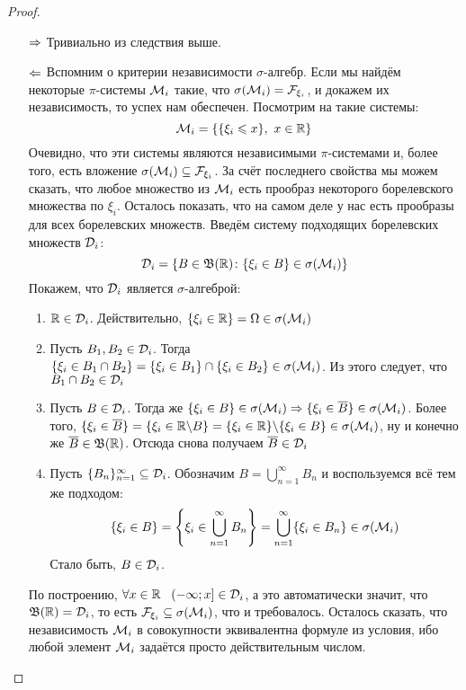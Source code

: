 \begin{proof}~
	\begin{itemize}
		\item[$\Rightarrow$] Тривиально из следствия выше.
		
		\item[$\Leftarrow$] Вспомним о критерии независимости $\sigma$-алгебр. Если мы найдём некоторые $\pi$-системы $\mathcal{M}_i$ такие, что $\sigma(\mathcal{M}_i) = \mathcal{F}_{\xi_i}$, и докажем их независимость, то успех нам обеспечен. Посмотрим на такие системы:
		\[
			\mathcal{M}_i = \{\{\xi_i \leqslant x\},\ x \in \mathbb{R}\}
		\]
		Очевидно, что эти системы являются независимыми $\pi$-системами и, более того, есть вложение $\sigma(\mathcal{M}_i) \subseteq \mathcal{F}_{\xi_i}$. За счёт последнего свойства мы можем сказать, что любое множество из $\mathcal{M}_i$ есть прообраз некоторого борелевского множества по $\xi_i$. Осталось показать, что на самом деле у нас есть прообразы для всех борелевских множеств. Введём систему подходящих борелевских множеств $\mathcal{D}_i$:
		\[
			\mathcal{D}_i = \{B \in \mathfrak{B}(\mathbb{R}) \colon \{\xi_i \in B\} \in \sigma(\mathcal{M}_i)\}
		\]
		Покажем, что $\mathcal{D}_i$ является $\sigma$-алгеброй:
		\begin{enumerate}
			\item $\mathbb{R} \in \mathcal{D}_i$. Действительно, $\{\xi_i \in \mathbb{R}\} = \Omega \in \sigma(\mathcal{M}_i)$
			
			\item Пусть $B_1, B_2 \in \mathcal{D}_i$. Тогда $\{\xi_i \in B_1 \cap B_2\} = \{\xi_i \in B_1\} \cap \{\xi_i \in B_2\} \in \sigma(\mathcal{M}_i)$. Из этого следует, что $B_1 \cap B_2 \in \mathcal{D}_i$
			
			\item Пусть $B \in \mathcal{D}_i$. Тогда же $\{\xi_i \in B\} \in \sigma(\mathcal{M}_i) \Rightarrow \{\xi_i \in \overline{B}\} \in \sigma(\mathcal{M}_i)$. Более того, $\{\xi_i \in \overline{B}\} = \{\xi_i \in \mathbb{R} \backslash B\} = \{\xi_i \in \mathbb{R}\} \backslash \{\xi_i \in B\} \in \sigma(\mathcal{M}_i)$, ну и конечно же $\overline{B} \in \mathfrak{B}(\mathbb{R})$. Отсюда снова получаем $\overline{B} \in \mathcal{D}_i$
			
			\item Пусть $\{B_n\}_{n = 1}^\infty \subseteq \mathcal{D}_i$. Обозначим $B = \bigcup_{n = 1}^\infty B_n$ и воспользуемся всё тем же подходом:
			\[
				\{\xi_i \in B\} = \left\{\xi_i \in \bigcup_{n = 1}^\infty B_n\right\} = \bigcup_{n = 1}^\infty \{\xi_i \in B_n\} \in \sigma(\mathcal{M}_i)
			\]
			Стало быть, $B \in \mathcal{D}_i$.
		\end{enumerate}
		По построению, $\forall x \in \R\ \ \rsi{-\infty; x} \in \cD_i$, а это автоматически значит, что $\mathfrak{B}(\mathbb{R}) = \mathcal{D}_i$, то есть $\mathcal{F}_{\xi_i} \subseteq \sigma(\mathcal{M}_i)$, что и требовалось. Осталось сказать, что независимость $\mathcal{M}_i$ в совокупности эквивалентна формуле из условия, ибо любой элемент $\mathcal{M}_i$ задаётся просто действительным числом.
	\end{itemize}
\end{proof}
